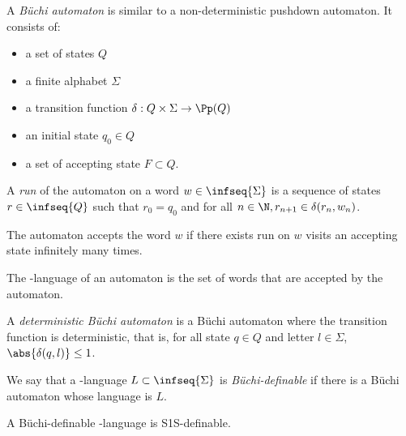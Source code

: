 \begin{definition}
    A \emph{Büchi automaton} is similar to a non-deterministic pushdown automaton.
    It consists of:
    \begin{itemize}
        \item a set of states $Q$
        \item a finite alphabet $\Sigma$
        \item a transition function $\delta : Q \times \Sigma \to \Pp(Q)$
        \item an initial state $q_0 \in Q$
        \item a set of accepting state $F \subset Q$.
    \end{itemize}

    A \emph{run} of the automaton
    on a word $w \in \infseq{\Sigma}$
    is a sequence of states $r \in \infseq{Q}$
    such that $r_0 = q_0$ and for all $n \in \N, r_{n+1} \in \delta(r_n, w_n)$.

    The automaton accepts the word $w$ if there exists run on $w$
    visits an accepting state infinitely many times.

    The \w-language of an automaton is the set of words
    that are accepted by the automaton.
\end{definition}

\begin{definition}
    A \emph{deterministic Büchi automaton} is a Büchi automaton
    where the transition function is deterministic, that is,
    for all state $q \in Q$ and letter $l \in \Sigma$,
    $\abs{\delta(q, l)} \leq 1$.
\end{definition}


We say that a \w-language $L \subset \infseq{\Sigma}$ is
\emph{Büchi-definable} if there is a Büchi automaton
whose language is $L$.

\begin{lemma}\label{lemma:buchi-definable}
    A Büchi-definable \w-language is S1S-definable.
\end{lemma}

